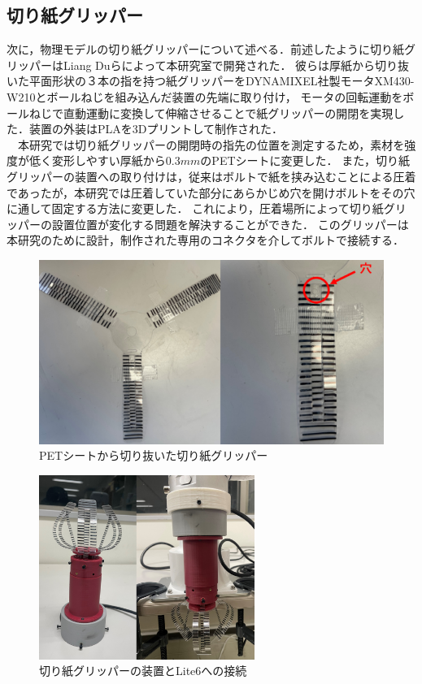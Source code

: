 \subsection{切り紙グリッパー}
次に，物理モデルの切り紙グリッパーについて述べる．前述したように切り紙グリッパーはLiang Duらによって本研究室で開発された．
彼らは厚紙から切り抜いた平面形状の３本の指を持つ紙グリッパーをDYNAMIXEL社製モータXM430-W210とボールねじを組み込んだ装置の先端に取り付け，
モータの回転運動をボールねじで直動運動に変換して伸縮させることで紙グリッパーの開閉を実現した．装置の外装はPLAを3Dプリントして制作された．\\
　本研究では切り紙グリッパーの開閉時の指先の位置を測定するため，素材を強度が低く変形しやすい厚紙から$0.3mm$のPETシートに変更した．
また，切り紙グリッパーの装置への取り付けは，従来はボルトで紙を挟み込むことによる圧着であったが，本研究では圧着していた部分にあらかじめ穴を開けボルトをその穴に通して固定する方法に変更した．
これにより，圧着場所によって切り紙グリッパーの設置位置が変化する問題を解決することができた．
このグリッパーは本研究のために設計，制作された専用のコネクタを介してボルトで接続する．

\begin{figure}[htbt]
	\centering
	 \includegraphics[height=60mm]{pet_gripper.eps}
	 \caption{PETシートから切り抜いた切り紙グリッパー}
	 \label{fig:f2}
\end{figure}
\begin{figure}[htbt]
	\centering
	 \includegraphics[height=60mm]{kirigami_gripper.eps}
	 \caption{切り紙グリッパーの装置とLite6への接続}
	 \label{fig:f2}
\end{figure}


